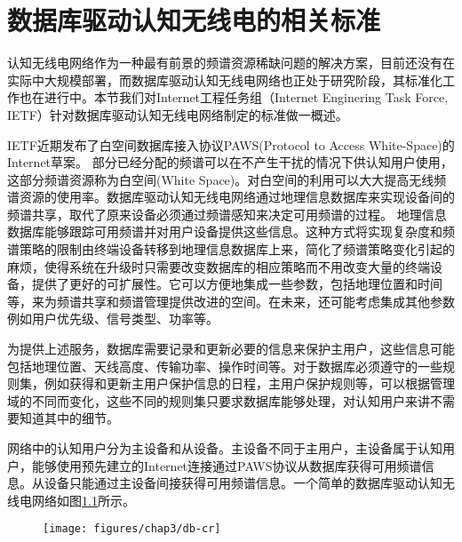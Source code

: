 
\chapter{数据库驱动认知无线电的相关标准}
\label{chap:standard}

认知无线电网络作为一种最有前景的频谱资源稀缺问题的解决方案，目前还没有在实际中大规模部署，而数据库驱动认知无线电网络也正处于研究阶段，其标准化工作也在进行中。本节我们对Internet工程任务组（Internet Enginering Task Force, IETF）针对数据库驱动认知无线电网络制定的标准做一概述。

IETF近期发布了白空间数据库接入协议PAWS(Protocol to Access White-Space)的Internet草案\cite{zhu2014protocol}。
部分已经分配的频谱可以在不产生干扰的情况下供认知用户使用，这部分频谱资源称为白空间(White Space)。对白空间的利用可以大大提高无线频谱资源的使用率。数据库驱动认知无线电网络通过地理信息数据库来实现设备间的频谱共享，取代了原来设备必须通过频谱感知来决定可用频谱的过程。
地理信息数据库能够跟踪可用频谱并对用户设备提供这些信息。这种方式将实现复杂度和频谱策略的限制由终端设备转移到地理信息数据库上来，简化了频谱策略变化引起的麻烦，使得系统在升级时只需要改变数据库的相应策略而不用改变大量的终端设备，提供了更好的可扩展性。它可以方便地集成一些参数，包括地理位置和时间等，来为频谱共享和频谱管理提供改进的空间。在未来，还可能考虑集成其他参数例如用户优先级、信号类型、功率等。

为提供上述服务，数据库需要记录和更新必要的信息来保护主用户，这些信息可能包括地理位置、天线高度、传输功率、操作时间等。对于数据库必须遵守的一些规则集，例如获得和更新主用户保护信息的日程，主用户保护规则等，可以根据管理域的不同而变化，这些不同的规则集只要求数据库能够处理，对认知用户来讲不需要知道其中的细节。

网络中的认知用户分为主设备和从设备。主设备不同于主用户，主设备属于认知用户，能够使用预先建立的Internet连接通过PAWS协议从数据库获得可用频谱信息。从设备只能通过主设备间接获得可用频谱信息。一个简单的数据库驱动认知无线电网络如图\ref{fig:db-cr}所示。


\begin{figure}[!htp]\label{fig:db-cr}
  \centering
  \texttt{[image: figures/chap3/db-cr]}
\end{figure}



